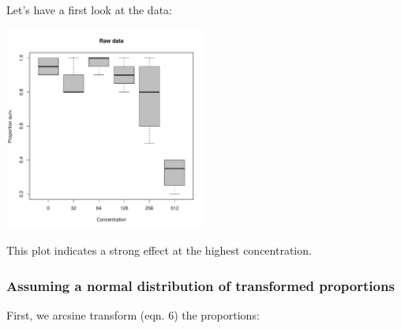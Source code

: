 Let's have a first look at the data:
\begin{knitrout}
\color{fgcolor}\begin{kframe}
\begin{alltt}
 \hlopt{~}   
         \hlstd{=} \hlstd{,}  \hlstd{=} \hlstd{,}
         \hlstd{=} \hlstd{,}  \hlstd{=} \hlstd{)}
\end{alltt}
\end{kframe}

{\centering \includegraphics[width=0.5\textwidth]{appendix/usetheglm/two/bin_raw_plot-1} 

}



\end{knitrout}
This plot indicates a strong effect at the highest concentration.


\subsubsection{Assuming a normal distribution of transformed proportions}
First, we arcsine transform (eqn. 6) the proportions:
\begin{knitrout}
\color{fgcolor}\begin{kframe}
\begin{alltt}
\hlopt{$} \hlkwb{<-} \hlopt{$} \hlopt{==} \hlstd{,}
                     \hlstd{(}\hlstd{)} \hlopt{-} \hlstd{(}\hlstd{(}\hlopt{/}\hlstd{)),}
                     \hlopt{$} \hlopt{==} \hlstd{,}
                            \hlstd{(}\hlstd{(}\hlopt{/}\hlstd{)),}
                            \hlstd{(}\hlopt{$}
                            \hlstd{)}
                     \hlstd{)}
\end{alltt}
\end{kframe}
\end{knitrout}

